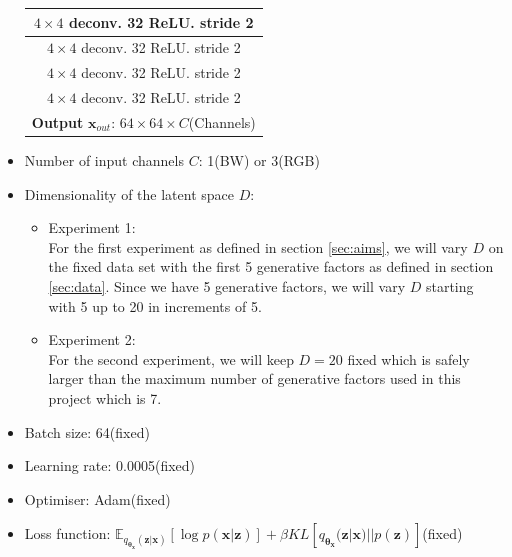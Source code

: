 \begin{itemize}
\begin{center}
\begin{tabular}{| c | c |}
                    \multicolumn{2}{|c|}{$4 \times 4$ deconv. 32 ReLU. stride 2}\\
                    \hline
                    \multicolumn{2}{|c|}{$4 \times 4$ deconv. 32 ReLU. stride 2}\\
                    \hline
                    \multicolumn{2}{|c|}{$4 \times 4$ deconv. 32 ReLU. stride 2}\\
                    \hline
                    \multicolumn{2}{|c|}{$4 \times 4$ deconv. 32 ReLU. stride 2}\\
                    \hline
                    \multicolumn{2}{|c|}{\textbf{Output} $\bm{x}_{out}$: $64 \times 64 \times C$(Channels)}\\
                    \hline
                \end{tabular}
            \end{center}
                
            \item Number of input channels $C$: 1(BW) or 3(RGB)
            
            \item Dimensionality of the latent space $D$:
            \begin{itemize}
                \item Experiment 1:\\
                For the first experiment as defined in section \ref{sec:aims}, we will vary $D$ on the fixed data set with the first 5 generative factors as defined in section \ref{sec:data}. Since we have 5 generative factors, we will vary $D$ starting with 5 up to 20 in increments of 5.
                
                \item Experiment 2:\\
                For the second experiment, we will keep $D=20$ fixed which is safely larger than the maximum number of generative factors used in this project which is 7.
            \end{itemize}
            
            \item Batch size: 64(fixed)
            
            \item Learning rate: 0.0005(fixed)
            
            \item Optimiser: Adam(fixed)
            
            \item Loss function: $\mathbb{E}_{q_{\bm{\theta_x}}(\bm{z}|\bm{x})} \left[\log p(\bm{x} | \bm{z}) \right] + \beta KL\left[q_{\bm{\theta_x}}(\bm{z}|\bm{x}) || p(\bm{z})\right]$(fixed)
            

\end{itemize}
